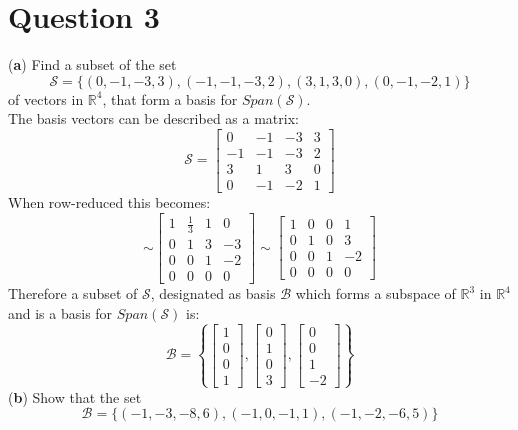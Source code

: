 \documentclass[12pt]{article}
\begin{document}
\section*{Question 3}
(\textbf{a}) Find a subset of the set
$$
\mathcal{S}=\{(0, -1, -3, 3), (-1, -1, -3, 2), (3, 1, 3, 0), (0, -1, -2, 1)\}
$$
of vectors in $\mathbb{R}^4$, that form a basis for $Span(\mathcal{S})$.\\
\medskip
The basis vectors can be described as a matrix:\\
$$
\mathcal{S}=
\begin{bmatrix}
   0 & -1 & -3 & 3 \\
   -1 & -1 & -3 & 2 \\
   3 & 1 & 3 & 0 \\
   0 & -1 & -2 & 1
\end{bmatrix}
$$
When row-reduced this becomes:
$$
\sim
\begin{bmatrix}
   1 & \frac{1}{3} & 1 & 0 \\
   0 & 1 & 3 & -3 \\
   0 & 0 & 1 & -2 \\
   0 & 0 & 0 & 0
\end{bmatrix}
\sim
\begin{bmatrix}
   1 & 0 & 0 & 1 \\
   0 & 1 & 0 & 3 \\
   0 & 0 & 1 & -2 \\
   0 & 0 & 0 & 0
\end{bmatrix}
$$
Therefore a subset of $\mathcal{S}$, designated as basis $\mathcal{B}$ which forms a subspace of $\mathbb{R}^3$ in $\mathbb{R}^4$ and is a basis for $Span(\mathcal{S})$ is:
$$
\mathcal{B}=\left\{
\begin{bmatrix}
   1 \\
   0 \\
   0 \\
   1
\end{bmatrix},
\begin{bmatrix}
   0 \\
   1 \\
   0 \\
   3
\end{bmatrix},
\begin{bmatrix}
   0 \\
   0 \\
   1 \\
   -2
\end{bmatrix}
\right\}
$$
(\textbf{b}) Show that the set
$$
\mathcal{B}=\{(-1,-3,-8,6),(-1,0,-1,1),(-1,-2,-6,5)\}
$$
\end{document}
